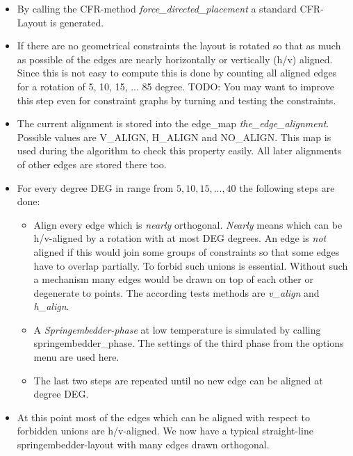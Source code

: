 \documentclass[notitlepage,fleqn]{article}
\begin{document}
\begin{itemize}
\item By calling the CFR-method {\em force\_directed\_placement} a standard CFR-Layout is generated. 

\item If there are no geometrical constraints
  the layout is rotated so that as much as possible of the edges are nearly
  horizontally or vertically (h/v) aligned. Since this is not easy to
  compute this is done by counting all aligned edges for a rotation
  of 5, 10, 15, ... 85 degree.
  TODO: You may want to improve this step even for constraint graphs
  by turning and testing the constraints.

\item The current alignment is stored into the
  edge\_map {\em the\_edge\_alignment}. Possible values are V\_ALIGN,
  H\_ALIGN and NO\_ALIGN. 
  This map is used during the algorithm to check this property easily.
  All later alignments of other edges are stored there too.
\item For every degree DEG in range from $5, 10, 15, ..., 40$ the
following steps are done:
\begin{itemize}

\item Align every edge which is {\em nearly} orthogonal. 
{\em Nearly} means which can be h/v-aligned by a rotation with 
at most DEG degrees. An edge is {\em not} aligned if this would join
some groups of constraints so that some edges have to overlap
partially. To forbid such unions is essential. Without such a 
mechanism many edges would be drawn on top of each other or
degenerate to points.
The according tests methods are {\em v\_align} and {\em h\_align}.

\item A {\em Springembedder-phase} at low temperature 
is simulated by calling springembedder\_phase. The settings
of the third phase from the options menu are used here.

\item The last two steps are repeated until no new edge
can be aligned at degree DEG.

\end{itemize}

\item {At this point most of the edges which can be aligned with
respect to forbidden unions are h/v-aligned.
We now have a typical straight-line springembedder-layout 
with many edges drawn orthogonal. 
 
}
\end{itemize}
\end{document}

